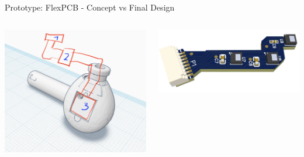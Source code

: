 \documentclass[en]{sdqbeamer}
\begin{document}
\begin{frame}{Prototype: FlexPCB - Concept vs Final Design}
\begin{columns}[T]
    \begin{column}{.48\textwidth}
      \includegraphics[width=0.9\linewidth]{../thesis-doc/images/prototype/flex_pcb_design_finding.png}
    \end{column}

    \begin{column}{.48\textwidth}
      \includegraphics[width=1.05\linewidth]{../thesis-doc/images/prototype/pcb/flex_pcb_3D.png}
    \end{column}
  \end{columns}
    
\end{frame}

    
\end{document}
